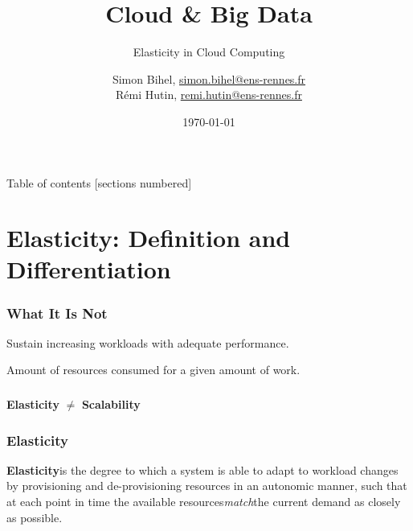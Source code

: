 \documentclass{beamer}
\title{Cloud \& Big Data}
\subtitle{Elasticity in Cloud Computing}
\date{\today}
\author{%
  Simon Bihel, \url{simon.bihel@ens-rennes.fr} \\
  Rémi Hutin, \url{remi.hutin@ens-rennes.fr}
}
\institute{%
  University of Rennes I \\
  École normale supérieure de Rennes
}
\begin{document}
\maketitle

\begin{frame}{Table of contents}
  [sections numbered]
  \tableofcontents[hideallsubsections]
\end{frame}


\section{Elasticity: Definition and Differentiation}
\begin{frame}
  \frametitle{What It Is Not~\cite{herbst2013elasticity}}
  \begin{description}
    \parbox{\linewidth}{
    \item[Scalability] Sustain increasing workloads with adequate performance.
    \item[Efficiency] Amount of resources consumed for a given amount of work.
    }
  \end{description}
\end{frame}


\begin{frame}
  \frametitle{}
  \centering
  \Large\textbf{Elasticity} $\neq$ \textbf{Scalability}

\end{frame}

\begin{frame}
  \frametitle{Elasticity~\cite{herbst2013elasticity}~\cite{galante2012survey}~\cite{gulati2011cloud}~\cite{sharma2011cost}~\cite{moore2013coordinated}}
  \begin{definition}
  \parbox{\linewidth}{\textbf{Elasticity}is the degree to which a system is able to adapt to workload changes by provisioning and de-provisioning resources in an autonomic manner, such that at each point in time the available resources\textit{match}the current demand as closely as possible.
  }
  \end{definition}
\end{frame}
\end{document}
